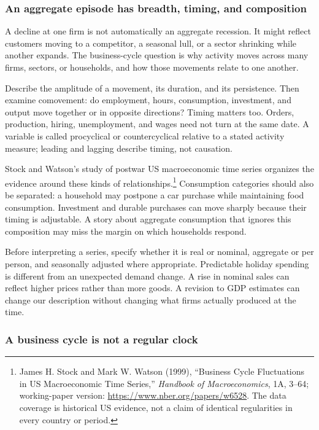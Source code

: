 \subsubsection{An aggregate episode has breadth, timing, and composition}

A decline at one firm is not automatically an aggregate recession. It
might reflect customers moving to a competitor, a seasonal lull, or a
sector shrinking while another expands. The business-cycle question is
why activity moves across many firms, sectors, or households, and how
those movements relate to one another.

Describe the amplitude of a movement, its duration, and its persistence.
Then examine comovement: do employment, hours, consumption, investment,
and output move together or in opposite directions? Timing matters too.
Orders, production, hiring, unemployment, and wages need not turn at the
same date. A variable is called procyclical or countercyclical relative
to a stated activity measure; leading and lagging describe timing, not
causation.

Stock and Watson's study of postwar US macroeconomic time series organizes
the evidence around these kinds of relationships.\footnote{James H. Stock
and Mark W. Watson (1999), ``Business Cycle Fluctuations in US Macroeconomic
Time Series,'' \textit{Handbook of Macroeconomics}, 1A, 3--64;
working-paper version: \url{https://www.nber.org/papers/w6528}. The data
coverage is historical US evidence, not a claim of identical regularities
in every country or period.}
Consumption categories should also be separated: a household may postpone
a car purchase while maintaining food consumption. Investment and durable
purchases can move sharply because their timing is adjustable. A story
about aggregate consumption that ignores this composition may miss the
margin on which households respond.

Before interpreting a series, specify whether it is real or nominal,
aggregate or per person, and seasonally adjusted where appropriate.
Predictable holiday spending is different from an unexpected demand change.
A rise in nominal sales can reflect higher prices rather than more goods.
A revision to GDP estimates can change our description without changing
what firms actually produced at the time.

\subsubsection{A business cycle is not a regular clock}

